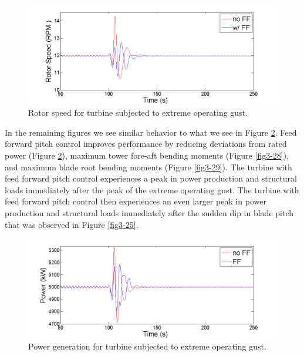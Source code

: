 \begin{figure}[htbp]
	\centering
		\includegraphics[trim = {1cm 0 2cm 0}, clip, width = \linewidth]{Figures/ch3Figures/fig3-26.png}
		
	\caption{Rotor speed for turbine subjected to extreme operating gust. }
	\label{fig3-26}
\end{figure}

In the remaining figures we see similar behavior to what we see in Figure \ref{fig3-27}. Feed forward pitch control improves performance by reducing deviations from rated power (Figure \ref{fig3-27}), maximum tower fore-aft bending moments (Figure \ref{fig3-28}), and maximum blade root bending moments (Figure \ref{fig3-29}). The turbine with feed forward pitch control experiences a peak in power production and structural loads immediately after the peak of the extreme operating gust. The turbine with feed forward pitch control then experiences an even larger peak in power production and structural loads immediately after the sudden dip in blade pitch that was observed in Figure \ref{fig3-25}.

\begin{figure}[htbp]
	\centering
		\includegraphics[trim = {1cm 0 2cm 0}, clip, width = \linewidth]{Figures/ch3Figures/fig3-27.png}
		
	\caption{Power generation for turbine subjected to extreme operating gust.}
	\label{fig3-27}
\end{figure}

